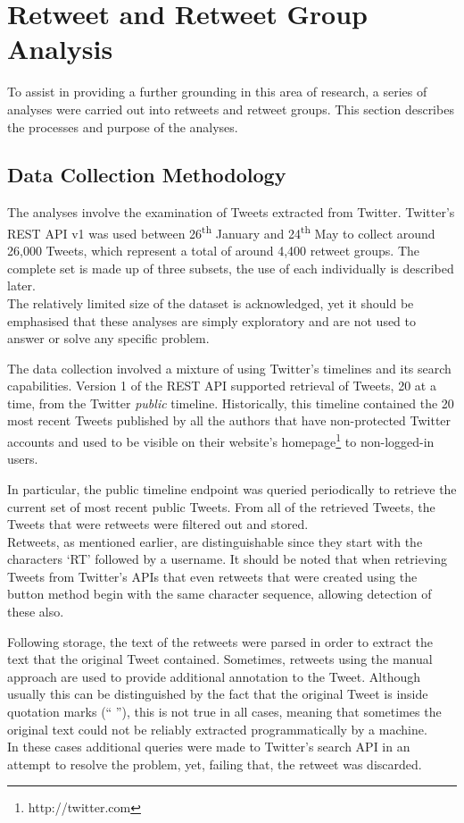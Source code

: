 \section{Retweet and Retweet Group Analysis}
To assist in providing a further grounding in this area of research, a series of analyses were carried out into retweets and retweet groups. This section describes the processes and purpose of the analyses.


\subsection{Data Collection Methodology}
The analyses involve the examination of Tweets extracted from Twitter. Twitter's REST API v1 was used between 26\textsuperscript{th} January and 24\textsuperscript{th} May to collect around 26,000 Tweets, which represent a total of around 4,400 retweet groups. The complete set is made up of three subsets, the use of each individually is described later.\\
The relatively limited size of the dataset is acknowledged, yet it should be emphasised that these analyses are simply exploratory and are not used to answer or solve any specific problem.

The data collection involved a mixture of using Twitter's timelines and its search capabilities. Version 1 of the REST API supported retrieval of Tweets, 20 at a time, from the Twitter \textit{public} timeline. Historically, this timeline contained the 20 most recent Tweets published by all the authors that have non-protected Twitter accounts and used to be visible on their website's homepage\footnote{http://twitter.com} to non-logged-in users.

In particular, the public timeline endpoint was queried periodically to retrieve the current set of most recent public Tweets. From all of the retrieved Tweets, the Tweets that were retweets were filtered out and stored.\\
Retweets, as mentioned earlier, are distinguishable since they start with the characters `RT' followed by a username. It should be noted that when retrieving Tweets from Twitter's APIs that even retweets that were created using the button method begin with the same character sequence, allowing detection of these also.

Following storage, the text of the retweets were parsed in order to extract the text that the original Tweet contained. Sometimes, retweets using the manual approach are used to provide additional annotation to the Tweet. Although usually this can be distinguished by the fact that the original Tweet is inside quotation marks (`` ''), this is not true in all cases, meaning that sometimes the original text could not be reliably extracted programmatically by a machine.\\
In these cases additional queries were made to Twitter's search API in an attempt to resolve the problem, yet, failing that, the retweet was discarded.

